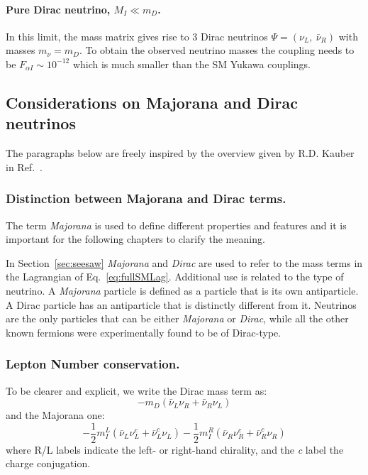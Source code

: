 \paragraph {Pure Dirac neutrino, $M_I \ll m_D$.}
In this limit, the mass matrix gives rise to 3 Dirac neutrinos $\Psi = (\nu_L,\:\bar{\nu}_R)$ with masses $m_\nu = m_D$. To obtain the observed neutrino masses the coupling needs to be $F_{\alpha I} \sim 10^{-12}$ which is much smaller than the SM Yukawa couplings.

\subsection{Considerations on Majorana and Dirac neutrinos}\label{sec:c3majo_dirac}
The paragraphs below are freely inspired by the overview given by
R.D. Kauber in Ref.~\cite{webpage_seesaw}.
\subsubsection {Distinction between Majorana and Dirac terms.}\label{sec:majo_dirac}
The term \emph{Majorana} is used to define different properties and features and it is important for the following chapters to clarify the meaning.

In Section~\ref{sec:seesaw} \emph{Majorana} and \emph{Dirac} are used to
refer to the mass terms in the Lagrangian of
Eq.~\ref{eq:fullSMLag}. Additional use is related to the type of
neutrino. A \emph{Majorana} particle is defined as a particle that is
its own antiparticle.  A Dirac particle has an antiparticle that is
distinctly different from it. Neutrinos are the only particles that can be either \emph{Majorana} or \emph{Dirac}, while all the other known fermions were experimentally found to be of Dirac-type.

\subsubsection{Lepton Number conservation.}\label{sec:lnv_lnc}
To be clearer and explicit, we write the Dirac mass term as:
\begin{equation}
\label{eq:c3dirac}
-m_D (\bar{\nu}_L\nu_R + \bar{\nu}_R\nu_L)
\end{equation}
and the Majorana one:
\begin{equation}
\label{eq:c3majorana}
-\frac{1}{2}m^{L}_{I}(\bar{\nu}_L\nu^{c}_L + \bar{\nu}_L^{c}\nu_L) -\frac{1}{2}m^{R}_{I} (\bar{\nu}_R\nu^{c}_R + \bar{\nu}_R^{c}\nu_R)
\end{equation}
where R/L labels indicate the left- or right-hand chirality, and the
\emph{c} label the charge conjugation.

